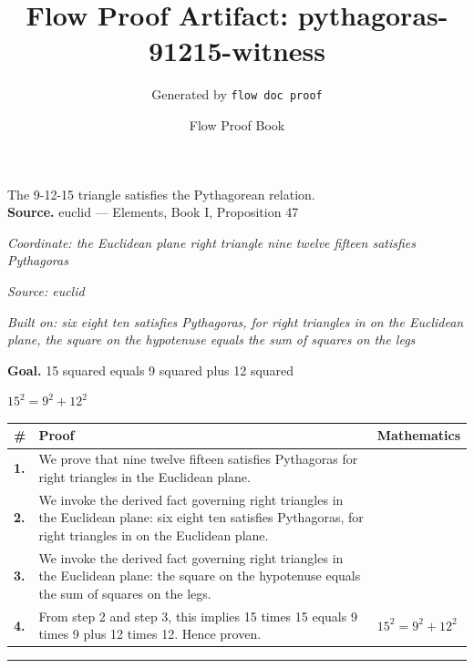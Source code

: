 \documentclass[11pt]{article}
\title{Flow Proof Artifact: pythagoras-91215-witness}
\author{Generated by \texttt{flow doc proof}}
\date{Flow Proof Book}
\theoremstyle{definition}
\begin{document}
\maketitle
The 9-12-15 triangle satisfies the Pythagorean relation.\\[0.5em]
\textbf{Source.} euclid — Elements, Book I, Proposition 47\\[0.5em]
\bigskip
{}\par
\smallskip\noindent\textit{Coordinate: the Euclidean plane \cdot right triangle \cdot nine twelve fifteen satisfies Pythagoras}\par
\smallskip\noindent\textit{Source: euclid}\par
\smallskip\noindent\textit{Built on: six eight ten satisfies Pythagoras, for right triangles in on the Euclidean plane, the square on the hypotenuse equals the sum of squares on the legs}\par
\medskip
\noindent\textbf{Goal.} 15 squared equals 9 squared plus 12 squared\par
\noindent$\displaystyle 15^{2} = 9^{2} + 12^{2}$\par
\medskip
\noindent
\begin{tabular}{@{} >{\raggedright\arraybackslash}p{} >{\raggedright\arraybackslash}p{} >{\raggedleft\arraybackslash}p{} @{}}
\textbf{\#} & \textbf{Proof} & \textbf{Mathematics} \\
\midrule
\textbf{1.} & We prove that nine twelve fifteen satisfies Pythagoras for right triangles in the Euclidean plane. & \\[0.45em]
\textbf{2.} & We invoke the derived fact governing right triangles in the Euclidean plane: six eight ten satisfies Pythagoras, for right triangles in on the Euclidean plane. & \\[0.45em]
\textbf{3.} & We invoke the derived fact governing right triangles in the Euclidean plane: the square on the hypotenuse equals the sum of squares on the legs. & \\[0.45em]
\textbf{4.} & From step 2 and step 3, this implies 15 times 15 equals 9 times 9 plus 12 times 12. Hence proven. & $\displaystyle 15^{2} = 9^{2} + 12^{2}$ \\[0.45em]
\bottomrule
\end{tabular}
\label{thm:Geometry-right triangle-nine_twelve_fifteen_satisfies_pythagoras}
\par\medskip\hrule
\end{document}
